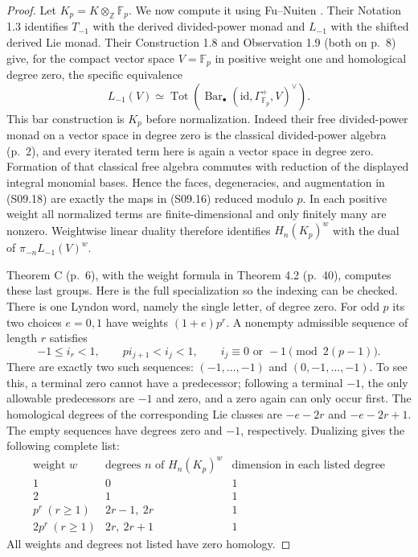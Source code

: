 \begin{proof}
Let $K_p=K\otimes_{\mathbb Z}\mathbb F_p$.  We now compute
it using Fu--Nuiten \cite{FuNuiten2026_check}.  Their Notation
1.3 identifies $T_{-1}$ with the derived divided-power monad
and $L_{-1}$ with the shifted derived Lie monad.  Their
Construction 1.8 and Observation 1.9 (both on p.~8) give,
for the compact vector space $V=\mathbb F_p$ in positive
weight one and homological degree zero, the specific equivalence
\[
 L_{-1}(V)
 \simeq
 \operatorname{Tot}\left(
    \operatorname{Bar}_\bullet(\mathrm{id},\Gamma^+_{\mathbb F_p},V)
                       ^\vee\right).
 \tag{S09.18}
\]
This bar construction is $K_p$ before normalization.
Indeed their free divided-power monad on a vector space in
degree zero is the classical divided-power algebra (p.~2),
and every iterated term here is again a vector space in degree
zero.  Formation of that classical free algebra commutes with
reduction of the displayed integral monomial bases.  Hence the
faces, degeneracies, and augmentation in (S09.18) are exactly
the maps in (S09.16) reduced modulo $p$.  In each positive
weight all normalized terms are finite-dimensional and only
finitely many are nonzero.  Weightwise linear duality therefore
identifies $H_n(K_p)^w$ with the dual of
$\pi_{-n}L_{-1}(V)^w$.

Theorem C (p.~6), with the weight formula in Theorem 4.2
(p.~40), computes these last groups.  Here is the full
specialization so the indexing can be checked.  There is one
Lyndon word, namely the single letter, of degree zero.
For odd $p$ its two choices $e=0,1$ have weights
$(1+e)p^r$.  A nonempty admissible sequence of length $r$
satisfies
\[
 -1\leq i_r<1,\qquad
 p i_{j+1}<i_j<1,\qquad
 i_j\equiv0\text{ or }-1\pmod{2(p-1)}.
\]
There are exactly two such sequences: $(-1,\ldots,-1)$
and $(0,-1,\ldots,-1)$.  To see this, a terminal zero
cannot have a predecessor; following a terminal $-1$, the
only allowable predecessors are $-1$ and zero, and a zero
again can only occur first.  The homological degrees of the
corresponding Lie classes are $-e-2r$ and $-e-2r+1$.
The empty sequences have degrees zero and $-1$, respectively.
Dualizing gives the following complete list:
\[
\begin{array}{c|c|c}
 \text{weight }w&\text{degrees }n\text{ of }H_n(K_p)^w
       &\text{dimension in each listed degree}\\ \hline
 1&0&1\\
 2&1&1\\
 p^r\ (r\geq1)&2r-1,\ 2r&1\\
 2p^r\ (r\geq1)&2r,\ 2r+1&1
\end{array}
\tag{S09.19}
\]
All weights and degrees not listed have zero homology.


\end{proof}
